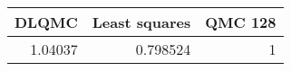 \begin{tabular}{rrr}
\toprule
   DLQMC &   Least squares &   QMC 128 \\
\midrule
 1.04037 &        0.798524 &         1 \\
\bottomrule
\end{tabular}
